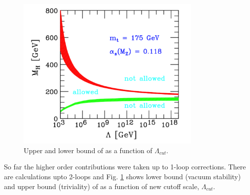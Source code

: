 \begin{figure}[t]
\centering
\includegraphics[width=0.8\textwidth]{figures/trivial_vacstab.pdf}
\caption{ Upper and lower bound of \mHi as a function of $\Lambda_{cut}$.
}
\label{fig:trivial_vacstab}
\end{figure}

So far the higher order contributions were taken up to 1-loop corrections. 
There are calculations upto 2-loops and Fig. \ref{fig:trivial_vacstab} 
shows lower bound (vacuum stability) and upper bound (triviality) of \mHi 
as a function of new cutoff scale, $\Lambda_{cut}$.

%
